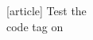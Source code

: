 \documentclass[letterpaper]{book}
\begin{document}
[article]
Test the \\code tag on 
\end{document}
